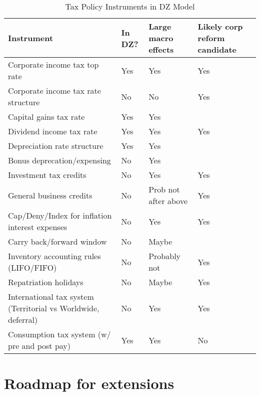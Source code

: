 \documentclass[article,11pt,letterpaper,fleqn]{article}
\theoremstyle{definition}
\numberwithin{equation}{section}
\begin{document}
\begin{table}[htbp]
  \centering
  \caption{Tax Policy Instruments in DZ Model}
    \begin{tabular}{llll}
    \hline
    \hline
    Instrument & In DZ? & Large macro effects & Likely corp reform candidate \\
    \hline
    Corporate income tax top rate & Yes   &   Yes   & Yes \\
    Corporate income tax rate structure & No     & No    & Yes \\
    Capital gains tax rate & Yes   & Yes   &  \\
    Dividend income tax rate & Yes   & Yes   & Yes \\
    Depreciation rate structure & Yes   &   Yes   &  \\
    Bonus deprecation/expensing & No    & Yes   &  \\
    Investment tax credits & No   & Yes   & Yes \\
    General business credits & No  & Prob not after above & Yes \\
    Cap/Deny/Index for inflation interest expenses & No        & Yes   & Yes \\
    Carry back/forward window & No    &  Maybe &  \\
    Inventory accounting rules (LIFO/FIFO) & No   & Probably not & Yes \\
    Repatriation holidays & No   & Maybe & Yes \\
    International tax system (Territorial vs Worldwide, deferral) & No   & Yes   & Yes \\
    Consumption tax system (w/ pre and post pay)  & Yes & Yes & No \\
    \hline
    \hline
    \end{tabular}%
  \label{tab:tax_instruments}%
\end{table}%


\section{Roadmap for extensions}
\end{document}
